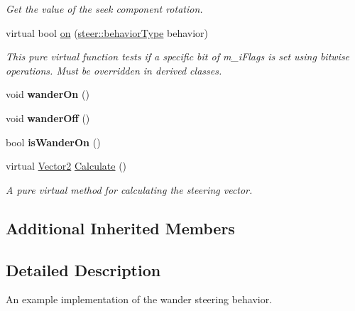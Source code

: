 \begin{DoxyCompactItemize}
\begin{DoxyCompactList}\small\item\em Get the value of the seek component rotation. \end{DoxyCompactList}\item 
virtual bool \hyperlink{classsteer_1_1_wander_component_abf53f90d185d86aebf2cb744fac59f37}{on} (\hyperlink{namespacesteer_afe6e72f8f8088962727051501181acbe}{steer\-::behavior\-Type} behavior)
\begin{DoxyCompactList}\small\item\em This pure virtual function tests if a specific bit of m\-\_\-i\-Flags is set using bitwise operations. Must be overridden in derived classes. \end{DoxyCompactList}\item 
\hypertarget{classsteer_1_1_wander_component_ac2f9e2a98cf68d628bec4e9a927a7423}{void {\bfseries wander\-On} ()}\label{classsteer_1_1_wander_component_ac2f9e2a98cf68d628bec4e9a927a7423}

\item 
\hypertarget{classsteer_1_1_wander_component_ad880ef234fcdfa926776f45b760e54c3}{void {\bfseries wander\-Off} ()}\label{classsteer_1_1_wander_component_ad880ef234fcdfa926776f45b760e54c3}

\item 
\hypertarget{classsteer_1_1_wander_component_af0be348a7d446704817061359c6053f7}{bool {\bfseries is\-Wander\-On} ()}\label{classsteer_1_1_wander_component_af0be348a7d446704817061359c6053f7}

\item 
\hypertarget{classsteer_1_1_wander_component_ab46e62ab424633354ce4eca25803caab}{virtual \hyperlink{structsteer_1_1_vector2}{Vector2} \hyperlink{classsteer_1_1_wander_component_ab46e62ab424633354ce4eca25803caab}{Calculate} ()}\label{classsteer_1_1_wander_component_ab46e62ab424633354ce4eca25803caab}

\begin{DoxyCompactList}\small\item\em A pure virtual method for calculating the steering vector. \end{DoxyCompactList}\end{DoxyCompactItemize}
\subsection*{Additional Inherited Members}


\subsection{Detailed Description}
An example implementation of the wander steering behavior. 

